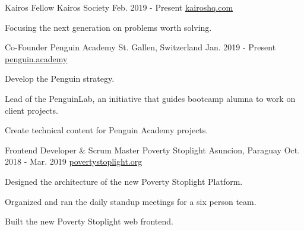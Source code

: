 

\begin{cventries}
  \cventry
    {Kairos Fellow} %
    {Kairos Society} %
    {} %
    {Feb. 2019 - Present} %
    {\href{https://kairoshq.com}{kairoshq.com}} %
    {
      \begin{cvitems} %
      \item {Focusing the next generation on problems worth solving.}
      \end{cvitems}
    }
  \cventry
    {Co-Founder} %
    {Penguin Academy} %
    {St. Gallen, Switzerland} %
    {Jan. 2019 - Present} %
    {\href{https://penguin.academy}{penguin.academy}} %
    {
      \begin{cvitems} %
      \item {Develop the Penguin strategy.}
      \item {Lead of the PenguinLab, an initiative that guides bootcamp alumna to work on client projects.}
      \item {Create technical content for Penguin Academy projects.}
      \end{cvitems}
    }
  \cventry
    {Frontend Developer \& Scrum Master} %
    {Poverty Stoplight} %
    {Asuncion, Paraguay} %
    {Oct. 2018 - Mar. 2019} %
    {\href{https://povertystoplight.org}{povertystoplight.org}} %
    {
      \begin{cvitems} %
      \item {Designed the architecture of the new Poverty Stoplight Platform.}
      \item {Organized and ran the daily standup meetings for a six person team.}
      \item {Built the new Poverty Stoplight web frontend.}
      \end{cvitems}
}
\end{cventries}
